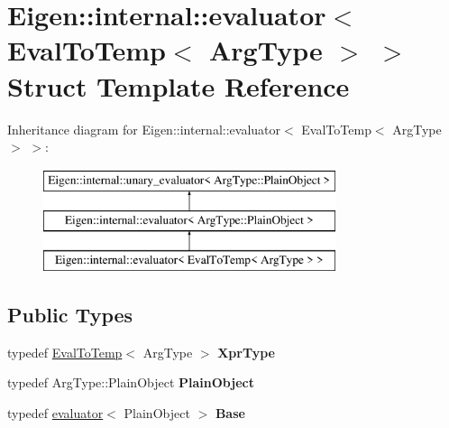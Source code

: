 \hypertarget{struct_eigen_1_1internal_1_1evaluator_3_01_eval_to_temp_3_01_arg_type_01_4_01_4}{}\section{Eigen\+::internal\+::evaluator$<$ Eval\+To\+Temp$<$ Arg\+Type $>$ $>$ Struct Template Reference}
\label{struct_eigen_1_1internal_1_1evaluator_3_01_eval_to_temp_3_01_arg_type_01_4_01_4}
Inheritance diagram for Eigen\+::internal\+::evaluator$<$ Eval\+To\+Temp$<$ Arg\+Type $>$ $>$\+:\begin{figure}[H]
\begin{center}
\leavevmode
\includegraphics[height=3.000000cm]{struct_eigen_1_1internal_1_1evaluator_3_01_eval_to_temp_3_01_arg_type_01_4_01_4}
\end{center}
\end{figure}
\subsection*{Public Types}
\begin{DoxyCompactItemize}
\item 
\mbox{\label{struct_eigen_1_1internal_1_1evaluator_3_01_eval_to_temp_3_01_arg_type_01_4_01_4_a423f47cd0a081523d452364e00a822a3}} 
typedef \mbox{\hyperlink{class_eigen_1_1internal_1_1_eval_to_temp}{Eval\+To\+Temp}}$<$ Arg\+Type $>$ {\bfseries Xpr\+Type}
\item 
\mbox{\label{struct_eigen_1_1internal_1_1evaluator_3_01_eval_to_temp_3_01_arg_type_01_4_01_4_ac0d6827b5b4855109b910dad3364079c}} 
typedef Arg\+Type\+::\+Plain\+Object {\bfseries Plain\+Object}
\item 
\mbox{\label{struct_eigen_1_1internal_1_1evaluator_3_01_eval_to_temp_3_01_arg_type_01_4_01_4_a8f3ef3fbb3c46e8cf734eeb058156fdb}} 
typedef \mbox{\hyperlink{struct_eigen_1_1internal_1_1evaluator}{evaluator}}$<$ Plain\+Object $>$ {\bfseries Base}
\end{DoxyCompactItemize}
